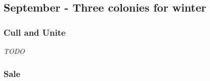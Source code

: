 \subsection{September - Three colonies for winter}

\subsubsection{Cull and Unite}

\emph{TODO}

\subsubsection{Sale}